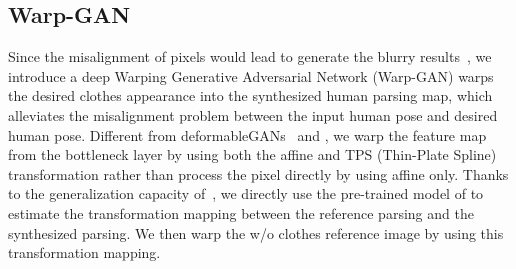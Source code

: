 \documentclass[10pt,twocolumn,letterpaper]{article}
\begin{document}
\subsection{Warp-GAN}
\label{s:wg}
Since the misalignment of pixels would lead to generate the blurry results~\cite{siarohin2017deformable}, we introduce a deep Warping Generative Adversarial Network (Warp-GAN) warps the desired clothes appearance into the synthesized human parsing map, which alleviates the misalignment problem between the input human pose and desired human pose. Different from deformableGANs~\cite{siarohin2017deformable} and \cite{balakrishnan2018synthesizing}, we warp the feature map from the bottleneck layer by using both the affine and TPS (Thin-Plate Spline)~\cite{bookstein1989tps} transformation rather than process the pixel directly by using affine only. Thanks to the generalization capacity of~\cite{Rocco2017geocnn}, we directly use the pre-trained model of \cite{Rocco2017geocnn} to estimate the transformation mapping between the reference parsing and the synthesized parsing. We then warp the w/o clothes reference image by using this transformation mapping. 
\end{document}
